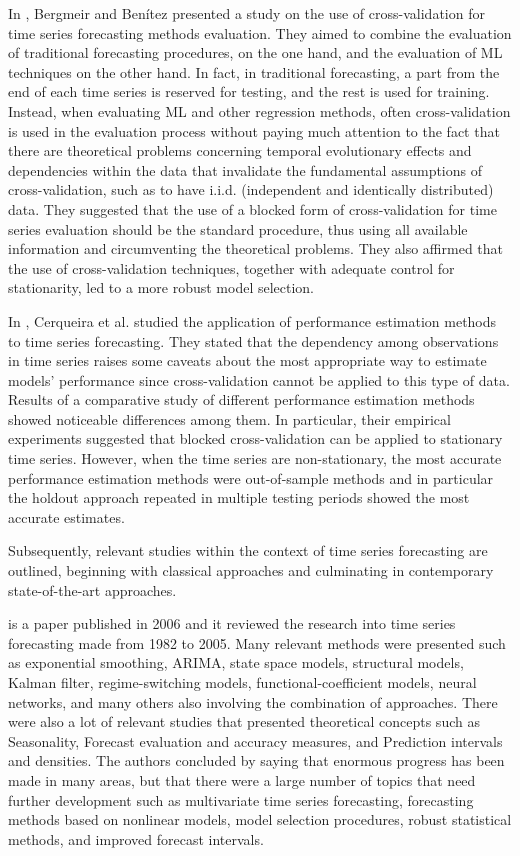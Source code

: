 In \cite{BERGMEIR2012192}, Bergmeir and Benítez presented a study on the use of cross-validation for time series forecasting methods evaluation.
They aimed to combine the evaluation of traditional forecasting procedures, on the one hand, and the evaluation of ML techniques on the other hand.
In fact, in traditional forecasting, a part from the end of each time series is reserved for testing, and the rest is used for training.
Instead, when evaluating ML and other regression methods, often cross-validation is used in the evaluation process without paying much attention to the fact that there are theoretical problems concerning temporal evolutionary effects and dependencies within the data that invalidate the fundamental assumptions of cross-validation, such as to have i.i.d. (independent and identically distributed) data.
They suggested that the use of a blocked form of cross-validation for time series evaluation should be the standard procedure, thus using all available information and circumventing the theoretical problems.
They also affirmed that the use of cross-validation techniques, together with adequate control for stationarity, led to a more robust model selection.

In \cite{Cerqueira2020}, Cerqueira et al. studied the application of performance estimation methods to time series forecasting.
They stated that the dependency among observations in time series raises some caveats about the most appropriate way to estimate models’ performance since cross-validation cannot be applied to this type of data.
Results of a comparative study of different performance estimation methods showed noticeable differences among them.
In particular, their empirical experiments suggested that blocked cross-validation can be applied to stationary time series.
However, when the time series are non-stationary, the most accurate performance estimation methods were out-of-sample methods and in particular the holdout approach repeated in multiple testing periods showed the most accurate estimates.

Subsequently, relevant studies within the context of time series forecasting are outlined, beginning with classical approaches and culminating in contemporary state-of-the-art approaches.

\cite{DEGOOIJER2006443} is a paper published in 2006 and it reviewed the research into time series forecasting made from 1982 to 2005.
Many relevant methods were presented such as exponential smoothing, ARIMA, state space models, structural models, Kalman filter, regime-switching models, functional-coefficient models, neural networks, and many others also involving the combination of approaches.
There were also a lot of relevant studies that presented theoretical concepts such as Seasonality, Forecast evaluation and accuracy measures, and Prediction intervals and densities.
The authors concluded by saying that enormous progress has been made in many areas, but that there were a large number of topics that need further development such as multivariate time series forecasting, forecasting methods based on nonlinear models, model selection procedures, robust statistical methods, and improved forecast intervals.

